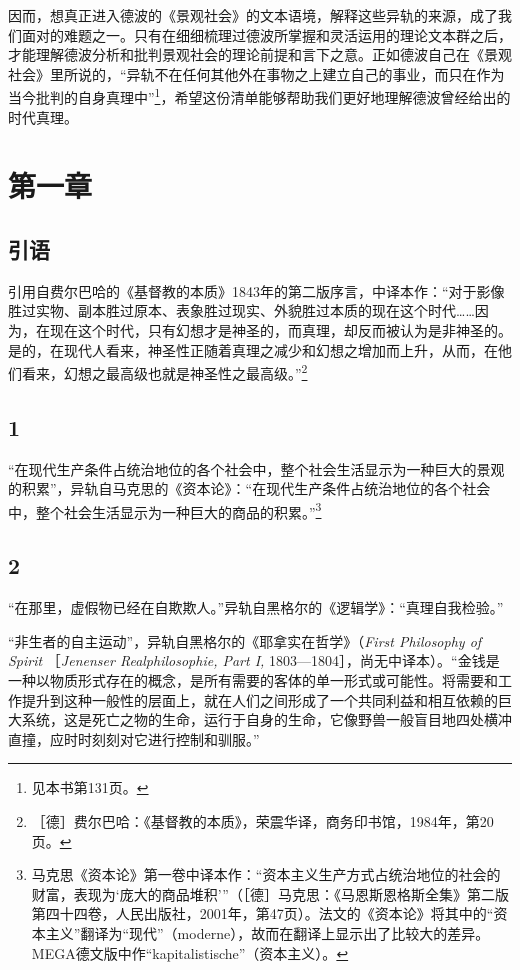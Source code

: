 \documentclass[fontset=fandol, a4paper, 12pt, openright]{ctexbook}
\begin{document}
{\kaishu 因而，想真正进入德波的《景观社会》的文本语境，解释这些异轨的来源，成了我们面对的难题之一。只有在细细梳理过德波所掌握和灵活运用的理论文本群之后，才能理解德波分析和批判景观社会的理论前提和言下之意。正如德波自己在《景观社会》里所说的，“异轨不在任何其他外在事物之上建立自己的事业，而只在作为当今批判的自身真理中”\footnote{见本书第131页。}，希望这份清单能够帮助我们更好地理解德波曾经给出的时代真理。}

\section*{第一章}

\subsection*{引语}
引用自费尔巴哈的《基督教的本质》1843年的第二版序言，中译本作：“对于影像胜过实物、副本胜过原本、表象胜过现实、外貌胜过本质的现在这个时代……因为，在现在这个时代，只有幻想才是神圣的，而真理，却反而被认为是非神圣的。是的，在现代人看来，神圣性正随着真理之减少和幻想之增加而上升，从而，在他们看来，幻想之最高级也就是神圣性之最高级。”\footnote{［德］费尔巴哈：《基督教的本质》，荣震华译，商务印书馆，1984年，第20页。}

\subsection*{1}
“在现代生产条件占统治地位的各个社会中，整个社会生活显示为一种巨大的景观的积累”，异轨自马克思的《资本论》：“在现代生产条件占统治地位的各个社会中，整个社会生活显示为一种巨大的商品的积累。”\footnote{马克思《资本论》第一卷中译本作：“资本主义生产方式占统治地位的社会的财富，表现为‘庞大的商品堆积’”（［德］马克思：《马恩斯恩格斯全集》第二版第四十四卷，人民出版社，2001年，第47页）。法文的《资本论》将其中的“资本主义”翻译为“现代”（moderne），故而在翻译上显示出了比较大的差异。MEGA德文版中作“kapitalistische”（资本主义）。}

\subsection*{2}
“在那里，虚假物已经在自欺欺人。”异轨自黑格尔的《逻辑学》：“真理自我检验。”

“非生者的自主运动”，异轨自黑格尔的《耶拿实在哲学》（\textit{First Philosophy of Spirit} ［\textit{Jenenser Realphilosophie, Part I,} 1803—1804］，尚无中译本）。“金钱是一种以物质形式存在的概念，是所有需要的客体的单一形式或可能性。将需要和工作提升到这种一般性的层面上，就在人们之间形成了一个共同利益和相互依赖的巨大系统，这是死亡之物的生命，运行于自身的生命，它像野兽一般盲目地四处横冲直撞，应时时刻刻对它进行控制和驯服。”
\end{document}
